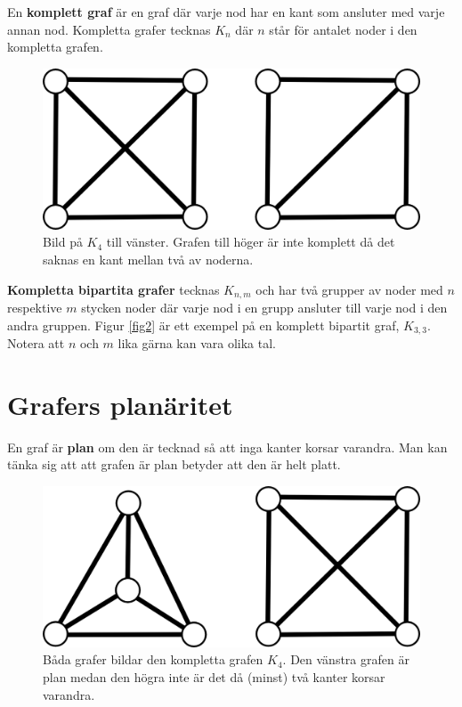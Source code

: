 \documentclass[a4paper,11pt]{article}
\begin{document}
En \textbf{komplett graf} är en graf där varje nod har en kant som ansluter med varje annan nod. Kompletta grafer tecknas $K_n$ där $n$ står för antalet noder i den kompletta grafen.

\begin{figure}[!ht]
	\begin{center}
		\includegraphics{fig3}
		\caption{Bild på $K_4$ till vänster. Grafen till höger är inte komplett då det saknas en kant mellan två av noderna.}
		\label{fig3}
	\end{center}
\end{figure}
\FloatBarrier

\textbf{Kompletta bipartita grafer} tecknas $K_{n,m}$ och har två grupper av noder med $n$ respektive $m$ stycken noder där varje nod i en grupp ansluter till varje nod i den andra gruppen. Figur \ref{fig2} är ett exempel på en komplett bipartit graf, $K_{3,3}$. Notera att $n$ och $m$ lika gärna kan vara olika tal.

\section*{Grafers planäritet}

En graf är \textbf{plan} om den är tecknad så att inga kanter korsar varandra. Man kan tänka sig att att grafen är plan betyder att den är helt platt.

\begin{figure}[!ht]
	\begin{center}
		\includegraphics{fig4}
		\caption{Båda grafer bildar den kompletta grafen $K_4$. Den vänstra grafen är plan medan den högra inte är det då (minst) två kanter korsar varandra.}
		\label{fig4}
	\end{center}
\end{figure}
\FloatBarrier
\end{document}
